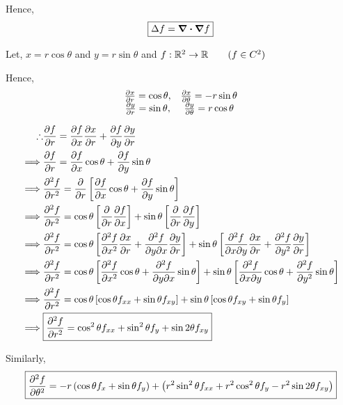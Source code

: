 \documentclass[../Analysis-3.tex]{subfiles}
\begin{document}
Hence, \[\boxed{\Delta f = \div\grad f}\]

Let, $x = r\cos{\theta}$ and $y= r\sin{\theta}$ and $f : \mathbb{R}^2 \to \mathbb{R} \qquad ( f \in C^2) $

Hence,
\[\begin{matrix}
    \pdv{x}{r} = \cos{\theta}, & \pdv{x}{\theta} = -r\sin{\theta} \\
    \pdv{y}{r} = \sin{\theta}, & \pdv{y}{\theta} = r\cos{\theta}
  \end{matrix}\]

\begin{align*}
  \therefore & \pdv{f}{r} = \pdv{f}{x} \pdv{x}{r} + \pdv{f}{y}\pdv{y}{r}                                                                                                                               \\
  \implies   & \pdv{f}{r} = \pdv{f}{x} \cos{\theta} + \pdv{f}{y}\sin{\theta}                                                                                                                           \\
  \implies   & \pdv[2]{f}{r} = \pdv{}{r} \left[\pdv{f}{x} \cos{\theta} + \pdv{f}{y} \sin{\theta} \right]                                                                                               \\
  \implies   & \pdv[2]{f}{r} = \cos{\theta} \left[\pdv{}{r} \pdv{f}{x}\right] + \sin{\theta} \left[\pdv{}{r} \pdv{f}{y} \right]                                                                        \\
  \implies   & \pdv[2]{f}{r} = \cos{\theta} \left[\pdv[2]{f}{x} \pdv{x}{r} + \pdv{f}{y}{x} \pdv{y}{r} \right] + \sin{\theta} \left[\pdv{f}{x}{y} \pdv{x}{r} + \pdv[2]{f}{y} \pdv{y}{r} \right]         \\
  \implies   & \pdv[2]{f}{r} = \cos{\theta} \left[\pdv[2]{f}{x} \cos{\theta} + \pdv{f}{y}{x} \sin{\theta} \right] + \sin{\theta} \left[\pdv{f}{x}{y} \cos{\theta} + \pdv[2]{f}{y} \sin{\theta} \right] \\
  \implies   & \pdv[2]{f}{r} = \cos{\theta} \left[\cos{\theta} f_{xx} + \sin{\theta} f_{xy} \right] + \sin{\theta} \left[\cos{\theta} f_{xy} + \sin{\theta} f_{y} \right]                              \\
  \implies   & \boxed{\pdv[2]{f}{r} = \cos^2 \theta f_{xx} + \sin^2 \theta f_{y} + \sin 2 \theta f_{xy}}
\end{align*}


Similarly, \[ \boxed{\pdv[2]{f}{\theta} = -r \left( \cos{\theta} f_x + \sin{\theta} f_y \right) + \left( r^2\sin^2 \theta f_{xx} + r^2\cos^2 \theta f_{y} - r^2\sin 2 \theta f_{xy} \right)} \]
\end{document}
